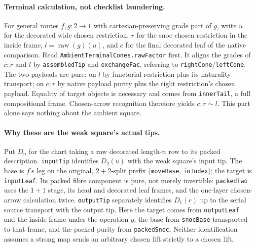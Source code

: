 \documentclass[11pt]{article}
\newcommand{\nm}[1]{\nolinkurl{#1}}
\newcommand{\al}{\mathrel{\sim}}
\begin{document}
\paragraph{Terminal calculation, not checklist laundering.}
For general routes $f,g:2\to1$ with cartesian-preserving grade part of $g$, write $u$ for the decorated wide chosen restriction, $r$ for the snoc chosen restriction in the inside frame, $l=\operatorname{raw}(g)(u)$, and $c$ for the final decorated leaf of the native comparison. Read \nm{AmbientTerminalCones.rawFactor} first. It aligns the grades of $c;r$ and $l$ by \nm{assembledTip} and \nm{exchangeFac}, referring to \nm{rightCone}/\nm{leftCone}. The two payloads are pure: on $l$ by functorial restriction plus its naturality transport; on $c;r$ by native payload purity plus the right restriction's chosen payload. Equality of target objects is necessary and comes from \nm{innerTail}, a full compositional frame. Chosen-arrow recognition therefore yields $c;r\al l$. This part alone says nothing about the ambient square.
\paragraph{Why these are the weak square's actual tips.}
Put $D_n$ for the chart taking a raw decorated length-$n$ row to its packed description. \nm{inputTip} identifies $D_2(u)$ with the weak square's input tip. The base is $f$'s leg on the original, $2+2$-split prefix (\nm{moveBase}, \nm{inIndex}); the target is \nm{inputLeaf}. Its packed fibre component is pure, not merely invertible: \nm{packedTwo} uses the $1+1$ stage, its head and decorated leaf frames, and the one-layer chosen-arrow calculation twice. \nm{outputTip} separately identifies $D_1(r)$ up to the serial source transport with the output tip. Here the target comes from \nm{outputLeaf} and the inside frame under the operation $g$, the base from \nm{snocBase} transported to that frame, and the packed purity from \nm{packedSnoc}. Neither identification assumes a strong map sends an arbitrary chosen lift strictly to a chosen lift.
\end{document}
